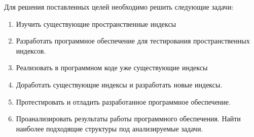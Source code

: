Для решения поставленных целей необходимо решить следующие задачи:
\begin{enumerate}
    \item Изучить существующие пространственные индексы
    \item Разработать программное обеспечение для тестирования пространственных индексов.
    \item Реализовать в программном коде уже существующие индексы
    \item Доработать существующие индексы и разработать новые индексы. 
    \item Протестировать и отладить разработанное программное обеспечение.
    \item Проанализировать результаты работы программного обеспечения. Найти наиболее подходящие структуры под анализируемые задачи.
\end{enumerate}
